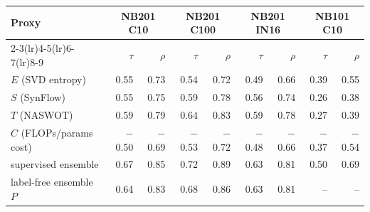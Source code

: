 \begin{tabular}{@{}lrrrrrrrr@{}}
\toprule
\multirow{2}{*}{Proxy} & \multicolumn{2}{c}{NB201 C10} & \multicolumn{2}{c}{NB201 C100} & \multicolumn{2}{c}{NB201 IN16} & \multicolumn{2}{c}{NB101 C10}\\
\cmidrule(lr){2-3}\cmidrule(lr){4-5}\cmidrule(lr){6-7}\cmidrule(lr){8-9}
 & $\tau$ & $\rho$ & $\tau$ & $\rho$ & $\tau$ & $\rho$ & $\tau$ & $\rho$\\
\midrule
$E$ (SVD entropy) & 0.55 & 0.73 & 0.54 & 0.72 & 0.49 & 0.66 & 0.39 & 0.55\\
$S$ (SynFlow) & 0.55 & 0.75 & 0.59 & 0.78 & 0.56 & 0.74 & 0.26 & 0.38\\
$T$ (NASWOT) & 0.59 & 0.79 & 0.64 & 0.83 & 0.59 & 0.78 & 0.27 & 0.39\\
$C$ (FLOPs/params cost) & $-$0.50 & $-$0.69 & $-$0.53 & $-$0.72 & $-$0.48 & $-$0.66 & $-$0.37 & $-$0.54\\
supervised ensemble & 0.67 & 0.85 & 0.72 & 0.89 & 0.63 & 0.81 & 0.50 & 0.69\\
label-free ensemble $P$ & 0.64 & 0.83 & 0.68 & 0.86 & 0.63 & 0.81 & -- & --\\
\bottomrule
\end{tabular}

